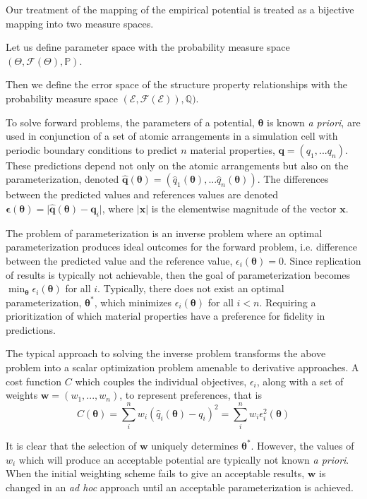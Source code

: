 Our treatment of the mapping of the empirical potential is treated as a bijective mapping into two measure spaces.

Let us define parameter space with the probability measure space $(\Theta,\mathcal{F}(\Theta),\mathbb{P})$.

Then we define the error space of the structure property relationships with the probability measure space $(\mathcal{E},\mathcal{F}(\mathcal{E})),\mathbb{Q})$.


To solve forward problems, the parameters of a potential, $\bm{\theta}$ is known \emph{a priori}, are used in conjunction of a set of atomic arrangements in a simulation cell with periodic boundary conditions to predict $n$ material properties, $\bm{q} = (q_1,...q_n)$.  These predictions depend not only on the atomic arrangements but also on the parameterization, denoted
$\bm{\hat{q}}(\bm{\theta}) =
    (\hat{q}_1(\bm{\theta}),...\hat{q}_n(\bm{\theta}))$.
The differences between the predicted values and references values are denoted
$\bm{\epsilon}(\bm{\theta}) =
    \lvert \bm{\hat{q}}(\bm{\theta})
         - \bm{q}_i
    \rvert$,
where $|\bm{x}|$ is the elementwise magnitude of the vector $\bm{x}$.

The problem of parameterization is an inverse problem where an optimal parameterization produces ideal outcomes for the forward problem, i.e. difference between the predicted value and the reference value,
$\epsilon_i(\bm{\theta}) = 0$.
Since replication of results is typically not achievable, then the goal of parameterization becomes
$\min_{\bm{\theta}} \epsilon_i(\bm{\theta})$
for all $i$.  Typically, there does not exist an optimal parameterization, $\bm{\theta}^*$, which minimizes $\epsilon_i(\bm{\theta})$ for all $i < n$.  Requiring a prioritization of which material properties have a preference for fidelity in predictions.

The typical approach to solving the inverse problem transforms the above problem into a scalar optimization problem amenable to derivative approaches.  A cost function $C$ which couples the individual objectives, $\epsilon_i$, along with a set of weights $\bm{w} = (w_1,...,w_n)$, to represent preferences, that is
\begin{equation}
    C(\bm{\theta}) = \sum_i^n w_i (\hat{q}_i(\bm{\theta}) - q_i)^2
                   = \sum_i^n w_i \epsilon_i^2(\bm{\theta})
\end{equation}

It is clear that the selection of $\bm{w}$ uniquely determines $\bm{\theta}^*$.  However, the values of $w_i$ which will produce an acceptable potential are typically not known \emph{a priori}.  When the initial weighting scheme fails to give an acceptable results, $\bm{w}$ is changed in an \emph{ad hoc} approach until an acceptable parameterization is achieved.

